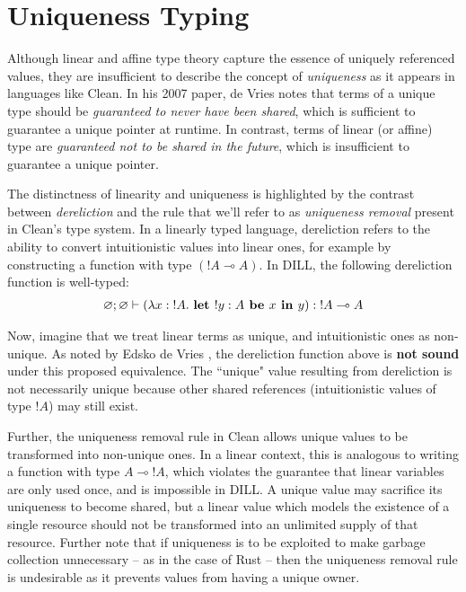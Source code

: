\documentclass[]{unswthesis}
\let\emptyset\varnothing
\newcommand{\lam}[1]{\lambda #1 \ldotp \,}
\newcommand{\lolly}{\multimap}
\newcommand{\types}{\vdash}
\newcommand{\letbe}[3]{\textbf{let $#1$ be $#2$ in $#3$}}
\let\i\textit
\let\b\textbf
\begin{document}

\section{Uniqueness Typing}

Although linear and affine type theory capture the essence of uniquely referenced values, they are insufficient to describe the concept of \i{uniqueness} as it appears in languages like Clean. In his 2007 paper, de Vries \cite{deVries07} notes that terms of a unique type should be \i{guaranteed to never have been shared}, which is sufficient to guarantee a unique pointer at runtime. In contrast, terms of linear (or affine) type are \i{guaranteed not to be shared in the future}, which is insufficient to guarantee a unique pointer.

The distinctness of linearity and uniqueness is highlighted by the contrast between \i{dereliction} and the rule that we'll refer to as \i{uniqueness removal} present in Clean's type system. In a linearly typed language, dereliction refers to the ability to convert intuitionistic values into linear ones, for example by constructing a function with type $({!A} \lolly A)$. In DILL, the following dereliction function is well-typed:
\begin{eqnarray*}
\emptyset; \emptyset \types (\lam{x : {!A}} \letbe{!y : A}{x}{y}) : {!A} \lolly A
\end{eqnarray*}

Now, imagine that we treat linear terms as unique, and intuitionistic ones as non-unique. As noted by Edsko de Vries \cite{deVriesPhD08}, the dereliction function above is \b{not sound} under this proposed equivalence. The ``unique" value resulting from dereliction is not necessarily unique because other shared references (intuitionistic values of type ${!A}$) may still exist.

Further, the uniqueness removal rule in Clean allows unique values to be transformed into non-unique ones. In a linear context, this is analogous to writing a function with type $A \lolly {!A}$, which violates the guarantee that linear variables are only used once, and is impossible in DILL. A unique value may sacrifice its uniqueness to become shared, but a linear value which models the existence of a single resource should not be transformed into an unlimited supply of that resource. Further note that if uniqueness is to be exploited to make garbage collection unnecessary -- as in the case of Rust -- then the uniqueness removal rule is undesirable as it prevents values from having a unique owner.
\end{document}
